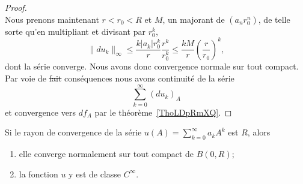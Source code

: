\begin{proof}
\begin{equation}
	\end{equation}
	Nous prenons maintenant \( r<r_0<R\) et \( M\), un majorant de \( (a_nr_0^n)\), de telle sorte qu'en multipliant et divisant par \( r_0^k\),
	\begin{equation}
		\| du_k \|_{\infty}\leq \frac{ k| a_k |r_0^k }{ r }\frac{ r^k }{ r_0^k }\leq \frac{ kM }{ r }\left( \frac{ r }{ r_0 } \right)^k,
	\end{equation}
	dont la série converge. Nous avons donc convergence normale sur tout compact. Par voie de \sout{fait} conséquences nous avons continuité de la série
	\begin{equation}
		\sum_{k=0}^{\infty}(du_k)_A
	\end{equation}
	et convergence vers \( df_A\) par le théorème~\ref{ThoLDpRmXQ}.
\end{proof}

\begin{proposition} \label{PropQIIURAh}
	Si le rayon de convergence de la série \( u(A)=\sum_{k=0}^{\infty}a_kA^k\) est \( R\), alors
	\begin{enumerate}
		\item
		      elle converge normalement sur tout compact de \( B(0,R)\);
		\item
		      la fonction \( u\) y est de classe \(  C^{\infty}\).
	\end{enumerate}
\end{proposition}

